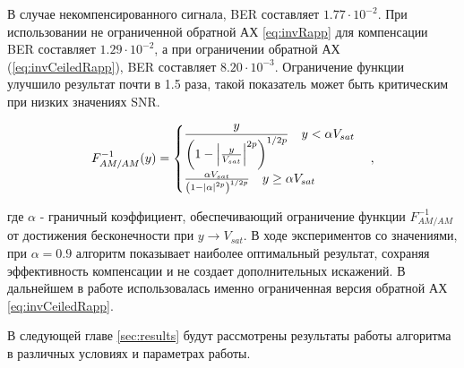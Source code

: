 В случае некомпенсированного сигнала, BER составляет $1.77\cdot 10^{-2}$.
При использовании не ограниченной обратной АХ \ref{eq:invRapp} для
компенсации BER составляет $1.29\cdot 10^{-2}$, а при ограничении обратной
АХ (\ref{eq:invCeiledRapp}), BER составляет $8.20 \cdot 10^{-3}$.
Ограничение функции улучшило результат почти в 1.5 раза, такой показатель
может быть критическим при низких значениях SNR.

\begin{equation}
    F^{-1}_{AM/AM}(y) = 
    \begin{cases}
        \displaystyle
       \frac{ y}{\left( 1 - \abs{\frac{y}{V_{sat}}}^{2p}\right)^{1/2p}}
       \quad y <\alpha V_{sat}\\
       \frac{ \alpha V_{sat}}{\left( 1 - \abs{\alpha}^{2p}\right)^{1/2p}}
       \quad y \geq \alpha V_{sat}
    \end{cases},
    \label{eq:invCeiledRapp}
\end{equation}

где $\alpha$ - граничный коэффициент, обеспечивающий ограничение функции
$F^{-1}_{AM/AM}$ от достижения бесконечности при $y \rightarrow V_{sat}$. В
ходе экспериментов со значениями, при $\alpha=0.9$ алгоритм показывает
наиболее оптимальный результат, сохраняя эффективность компенсации и не
создает дополнительных искажений. В дальнейшем в работе использовалась
именно ограниченная версия обратной АХ \ref{eq:invCeiledRapp}.

В следующей главе \ref{sec:results} будут рассмотрены результаты работы алгоритма в различных
условиях и параметрах работы.



